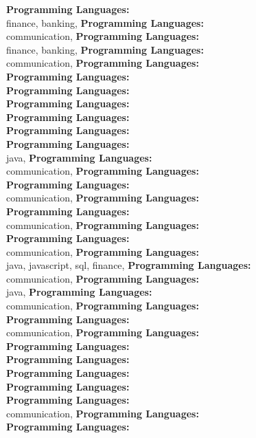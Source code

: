 \textbf{Programming Languages:} \\
finance, banking, \textbf{Programming Languages:} \\
communication, \textbf{Programming Languages:} \\
finance, banking, \textbf{Programming Languages:} \\
communication, \textbf{Programming Languages:} \\
\textbf{Programming Languages:} \\
\textbf{Programming Languages:} \\
\textbf{Programming Languages:} \\
\textbf{Programming Languages:} \\
\textbf{Programming Languages:} \\
\textbf{Programming Languages:} \\
java, \textbf{Programming Languages:} \\
communication, \textbf{Programming Languages:} \\
\textbf{Programming Languages:} \\
communication, \textbf{Programming Languages:} \\
\textbf{Programming Languages:} \\
communication, \textbf{Programming Languages:} \\
\textbf{Programming Languages:} \\
communication, \textbf{Programming Languages:} \\
java, javascript, sql, finance, \textbf{Programming Languages:} \\
communication, \textbf{Programming Languages:} \\
java, \textbf{Programming Languages:} \\
communication, \textbf{Programming Languages:} \\
\textbf{Programming Languages:} \\
communication, \textbf{Programming Languages:} \\
\textbf{Programming Languages:} \\
\textbf{Programming Languages:} \\
\textbf{Programming Languages:} \\
\textbf{Programming Languages:} \\
\textbf{Programming Languages:} \\
communication, \textbf{Programming Languages:} \\
\textbf{Programming Languages:} \\
